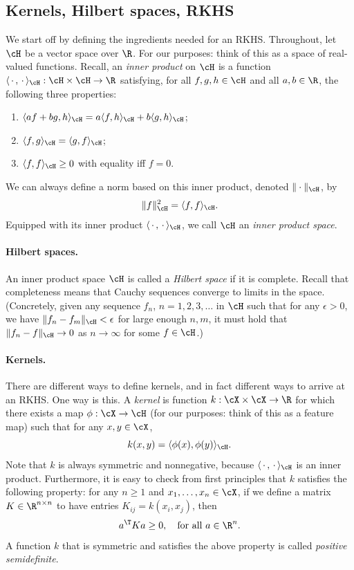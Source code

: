 \documentclass{article}
\begin{document}
\subsection{Kernels, Hilbert spaces, RKHS}

We start off by defining the ingredients needed for an RKHS. Throughout, let 
$\cH$ be a vector space over $\R$. For our purposes: think of this as a space of 
real-valued functions. Recall, an \emph{inner product} on $\cH$ is a function
$\langle \,\cdot\,, \,\cdot\, \rangle_\cH : \cH \times \cH \to \R$ satisfying,
for all $f,g,h \in \cH$ and all $a,b \in \R$, the following three properties:   
\begin{enumerate}
\item $\langle af + bg, h \rangle_\cH = a \langle f,h \rangle_\cH + b \langle
  g,h \rangle_\cH$;
\item $\langle f,g \rangle_\cH = \langle g,f \rangle_\cH$;
\item $\langle f,f \rangle_\cH \geq 0$ with equality iff $f=0$. 
\end{enumerate}
We can always define a norm based on this inner product, denoted
$\|\cdot\|_\cH$, by 
\[
\|f\|_\cH^2 = \langle f, f \rangle_\cH.
\]
Equipped with its inner product $\langle \,\cdot\,, \,\cdot\, \rangle_\cH$, we
call $\cH$ an \emph{inner product space}. 

\paragraph{Hilbert spaces.} 

An inner product space $\cH$ is called a \emph{Hilbert space} if it is
complete. Recall that completeness means that Cauchy sequences converge to   
limits in the space. (Concretely, given any sequence $f_n$, $n=1,2,3,\dots$ in
$\cH$ such that for any $\epsilon>0$, we have $\|f_n - f_m\|_\cH < \epsilon$ for
large enough $n,m$, it must hold that $\|f_n - f\|_\cH \to 0$ as $n \to \infty$
for some $f \in \cH$.)

\paragraph{Kernels.}

There are different ways to define kernels, and in fact different ways to arrive 
at an RKHS. One way is this. A \emph{kernel} is function $k : \cX \times \cX \to 
\R$ for which there exists a map $\phi : \cX \to \cH$ (for our purposes: think
of this as a feature map) such that for any $x,y \in \cX$,  
\[
k(x,y) = \langle \phi(x), \phi(y) \rangle_\cH.
\]
Note that $k$ is always symmetric and nonnegative, because $\langle \,\cdot\,, 
\,\cdot\, \rangle_\cH$ is an inner product. Furthermore, it is easy to check
from first principles that $k$ satisfies the following property: for any $n \geq
1$ and $x_1,\dots,x_n \in \cX$, if we define a matrix $K \in \R^{n \times n}$ to 
have entries $K_{ij} = k(x_i, x_j)$, then  
\[
a^\T K a \geq 0, \quad \text{for all $a \in \R^n$}.
\]
A function $k$ that is symmetric and satisfies the above property is called 
\emph{positive semidefinite}. 
\end{document}
